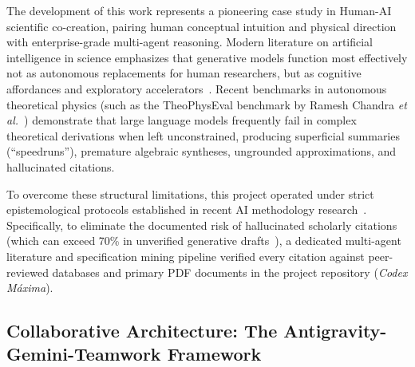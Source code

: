 \documentclass{optica-article}
\begin{document}
The development of this work represents a pioneering case study in Human-AI scientific co-creation, pairing human conceptual intuition and physical direction with enterprise-grade multi-agent reasoning. Modern literature on artificial intelligence in science emphasizes that generative models function most effectively not as autonomous replacements for human researchers, but as cognitive affordances and exploratory accelerators~\cite{OToole2024,VillaescusaNavarro2026}. Recent benchmarks in autonomous theoretical physics (such as the TheoPhysEval benchmark by Ramesh Chandra \emph{et al.}~\cite{Chandra2026TheoPhysEval}) demonstrate that large language models frequently fail in complex theoretical derivations when left unconstrained, producing superficial summaries (``speedruns''), premature algebraic syntheses, ungrounded approximations, and hallucinated citations.

To overcome these structural limitations, this project operated under strict epistemological protocols established in recent AI methodology research~\cite{Jauhiainen2026,Haber2025,Kacena2024}. Specifically, to eliminate the documented risk of hallucinated scholarly citations (which can exceed 70\% in unverified generative drafts~\cite{Kacena2024}), a dedicated multi-agent literature and specification mining pipeline verified every citation against peer-reviewed databases and primary PDF documents in the project repository (\emph{Codex Máxima}).

\subsection{Collaborative Architecture: The Antigravity-Gemini-Teamwork Framework}
\end{document}
